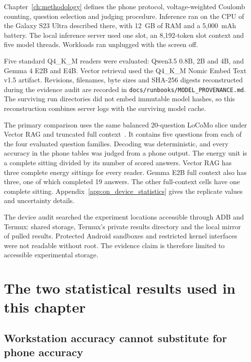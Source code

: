 Chapter~\ref{ch:methodology} defines the phone protocol, voltage-weighted Coulomb
counting, question selection and judging procedure. Inference ran on the CPU of the Galaxy
S23 Ultra described there, with 12~GB of RAM and a 5,000~mAh battery. The local inference server used one slot, an
8,192-token slot context and five model threads. Workloads ran unplugged with the screen
off.

Five standard Q4\_K\_M readers were evaluated: Qwen3.5 0.8B, 2B and 4B, and Gemma 4 E2B
and E4B. Vector retrieval used the Q4\_K\_M Nomic Embed Text v1.5 artifact. Revisions, filenames, byte sizes and
SHA-256 digests reconstructed during the evidence audit are
recorded in \texttt{docs/runbooks/MODEL\_PROVENANCE.md}. The surviving run directories
did not embed immutable model hashes, so this reconstruction combines server logs with
the surviving model cache.

The primary comparison uses the same balanced 20-question LoCoMo slice under Vector RAG
and truncated full context~\citep{locomo}. It contains five questions from each of the
four evaluated question families. Decoding was deterministic, and every accuracy in the
phone tables was judged from a phone output. The energy unit is a complete sitting
divided by its number of scored answers. Vector RAG has three complete energy sittings
for every reader. Gemma E2B full context also has three, one of which completed 19
answers. The other full-context cells have one complete sitting. Appendix~\ref{app:on_device_statistics} gives the replicate values and uncertainty details.

The device audit searched the experiment locations accessible through ADB and Termux:
shared storage, Termux's private results directory and the local mirror of pulled
results. Protected Android sandboxes and restricted kernel interfaces were not readable
without root. The evidence claim is therefore limited to accessible experimental
storage.

\section{The two statistical results used in this chapter}
\label{sec:ch5_statistical_story}

\subsection{Workstation accuracy cannot substitute for phone accuracy}
\label{sec:ch5_parity}

